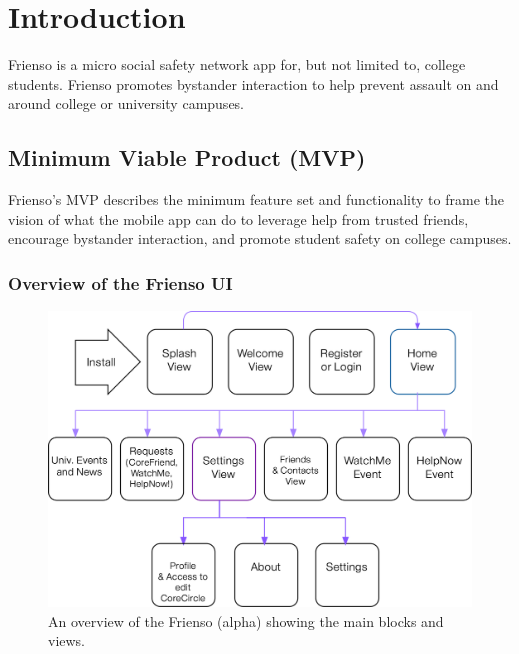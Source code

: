 
\chapter{Introduction}

\begin{introduction}
  Frienso is a micro social safety network app for, but not limited to, college students. 
  Frienso promotes bystander interaction to help prevent assault on and around college 
  or university campuses.
\end{introduction}

\section{Minimum Viable Product (MVP)}
  \begin{introduction}
  Frienso's MVP describes the minimum feature set and functionality to frame the vision
  of what the mobile app can do to leverage help from trusted friends, encourage bystander
  interaction, and promote student safety on college campuses.
  \end{introduction}

\subsection{Overview of the Frienso UI}
\begin{figure}[ht!]
 \centering
  \includegraphics[width=\textwidth]{images/flowchart.png}
	\caption{
	An overview of the Frienso (alpha) showing the main blocks and views. 
	}
	\end{figure}
	
